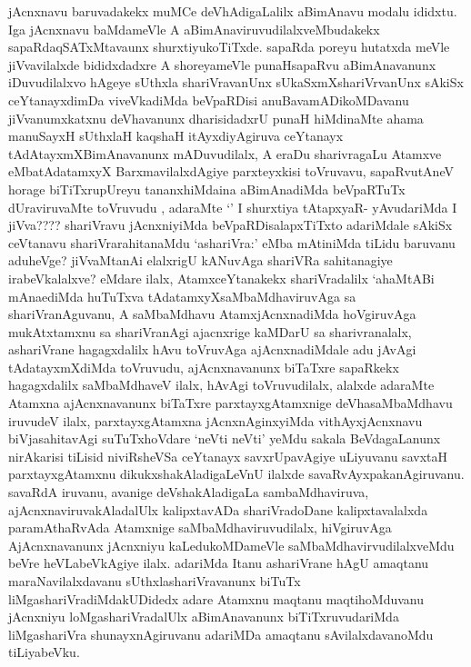 \begin{artha}
jAcnxnavu baruvadakekx muMCe deVhAdigaLalilx aBimAnavu modalu ididxtu. Iga jAcnxnavu baMdameVle A aBimAnaviruvudilalxveMbudakekx sapaRdaqSATxMtavaunx shurxtiyukoTiTxde. sapaRda poreyu hutatxda meVle jiVvavilalxde bididxdadxre A shoreyameVle punaHsapaRvu aBimAnavanunx iDuvudilalxvo hAgeye sUthxla shariVravanUnx sUkaSxmXshariVrvanUnx sAkiSx ceYtanayxdimDa viveVkadiMda beVpaRDisi anuBavamADikoMDavanu jiVvanumxkatxnu deVhavanunx dharisidadxrU punaH hiMdinaMte ahama manuSayxH sUthxlaH kaqshaH itAyxdiyAgiruva ceYtanayx tAdAtayxmXBimAnavanunx mADuvudilalx, A eraDu sharivragaLu Atamxve eMbatAdatamxyX BarxmavilalxdAgiye parxteyxkisi toVruvavu, sapaRvutAneV horage biTiTxrupUreyu tananxhiMdaina aBimAnadiMda beVpaRTuTx dUraviruvaMte toVruvudu , adaraMte `\stext' I shurxtiya tAtapxyaR- yAvudariMda I jiVva???? shariVravu jAcnxniyiMda beVpaRDisalapxTiTxto adariMdale sAkiSx ceVtanavu shariVrarahitanaMdu `ashariVra:' eMba mAtiniMda tiLidu baruvanu aduheVge? jiVvaMtanAi elalxrigU kANuvAga shariVRa sahitanagiye irabeVkalalxve? eMdare ilalx, AtamxceYtanakekx shariVradalilx `ahaMtABi mAnaediMda huTuTxva tAdatamxyXsaMbaMdhaviruvAga sa shariVranAguvanu, A saMbaMdhavu AtamxjAcnxnadiMda hoVgiruvAga mukAtxtamxnu sa shariVranAgi ajacnxrige kaMDarU sa sharivranalalx, ashariVrane  hagagxdalilx hAvu toVruvAga ajAcnxnadiMdale adu jAvAgi tAdatayxmXdiMda toVruvudu, ajAcnxnavanunx biTaTxre sapaRkekx hagagxdalilx saMbaMdhaveV ilalx, hAvAgi toVruvudilalx, alalxde adaraMte Atamxna ajAcnxnavanunx biTaTxre parxtayxgAtamxnige deVhasaMbaMdhavu iruvudeV ilalx, parxtayxgAtamxna jAcnxnAginxyiMda vithAyxjAcnxnavu biVjasahitavAgi suTuTxhoVdare `neVti neVti' yeMdu sakala BeVdagaLanunx nirAkarisi tiLisid niviRsheVSa ceYtanayx savxrUpavAgiye uLiyuvanu savxtaH parxtayxgAtamxnu dikukxshakAladigaLeVnU ilalxde savaRvAyxpakanAgiruvanu. savaRdA iruvanu, avanige deVshakAladigaLa sambaMdhaviruva, ajAcnxnaviruvakAladalUlx kalipxtavADa shariVradoDane kalipxtavalalxda paramAthaRvAda Atamxnige saMbaMdhaviruvudilalx, hiVgiruvAga AjAcnxnavanunx jAcnxniyu kaLedukoMDameVle saMbaMdhavirvudilalxveMdu beVre heVLabeVkAgiye ilalx. adariMda Itanu ashariVrane hAgU amaqtanu maraNavilalxdavanu sUthxlashariVravanunx biTuTx liMgashariVradiMdakUDidedx adare Atamxnu maqtanu maqtihoMduvanu jAcnxniyu loMgashariVradalUlx aBimAnavanunx biTiTxruvudariMda liMgashariVra shunayxnAgiruvanu adariMDa amaqtanu sAvilalxdavanoMdu tiLiyabeVku. 
\end{artha}

